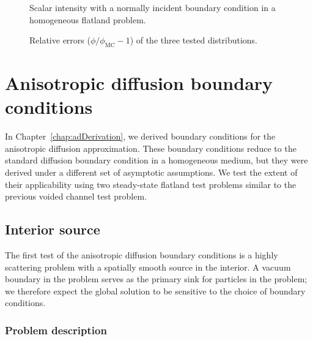 \begin{figure}[tb]
  \centering\small
  \hspace{-.25in}%
  
  \caption{Scalar intensity with a normally incident boundary condition in a
  homogeneous flatland problem.}
  \label{fig:flatlandBcDelta}
\end{figure}
 
\begin{figure}[tb]
  \centering\small
  \hspace{-.25in}%
  
  \caption{Relative errors ($\phi/\phi_\text{MC} - 1$) of the three tested
  distributions.}
  \label{fig:flatlandBcRelative}
\end{figure}

\thesisclearpage
\section{Anisotropic diffusion boundary conditions}

In Chapter~\ref{chap:adDerivation}, we derived boundary conditions for the
anisotropic diffusion approximation. These boundary conditions reduce to the
standard diffusion boundary condition in a homogeneous medium, but they were
derived under a different set of asymptotic assumptions. We test the extent of
their applicability using two steady-state flatland test problems similar to
the previous voided channel test problem.

\subsection{Interior source}

The first test of the anisotropic diffusion boundary conditions is a highly
scattering problem with a spatially smooth source in the interior. A vacuum
boundary in the problem serves as the primary sink for particles in the
problem; we therefore expect the global solution to be sensitive to the choice
of boundary conditions.

\subsubsection{Problem description}

